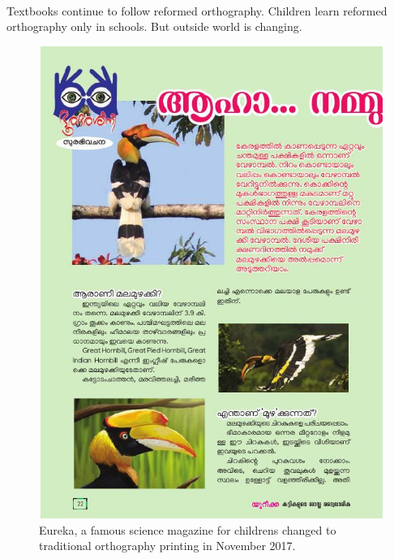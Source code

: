\documentclass[10pt]{article}
\begin{document}
\paragraph{}
Textbooks continue to follow reformed orthography. Children learn reformed orthography only in schools. But outside world is changing. 

\begin{figure}[H]
	\centering
	\includegraphics[scale=0.3]{images/2017-Eureka.jpg}
	\caption{Eureka, a famous science magazine for childrens changed to traditional orthography printing in November 2017.}
	\label{eureka}
\end{figure}



\end{document}
